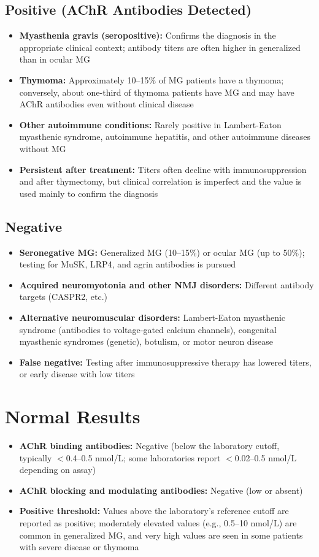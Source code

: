 \subsection*{Positive (AChR Antibodies Detected)}
\begin{itemize}
  \item \textbf{Myasthenia gravis (seropositive):} Confirms the diagnosis in the appropriate clinical context; antibody titers are often higher in generalized than in ocular MG
  \item \textbf{Thymoma:} Approximately 10--15\% of MG patients have a thymoma; conversely, about one-third of thymoma patients have MG and may have AChR antibodies even without clinical disease
  \item \textbf{Other autoimmune conditions:} Rarely positive in Lambert-Eaton myasthenic syndrome, autoimmune hepatitis, and other autoimmune diseases without MG
  \item \textbf{Persistent after treatment:} Titers often decline with immunosuppression and after thymectomy, but clinical correlation is imperfect and the value is used mainly to confirm the diagnosis
\end{itemize}

\subsection*{Negative}
\begin{itemize}
  \item \textbf{Seronegative MG:} Generalized MG (10--15\%) or ocular MG (up to 50\%); testing for MuSK, LRP4, and agrin antibodies is pursued
  \item \textbf{Acquired neuromyotonia and other NMJ disorders:} Different antibody targets (CASPR2, etc.)
  \item \textbf{Alternative neuromuscular disorders:} Lambert-Eaton myasthenic syndrome (antibodies to voltage-gated calcium channels), congenital myasthenic syndromes (genetic), botulism, or motor neuron disease
  \item \textbf{False negative:} Testing after immunosuppressive therapy has lowered titers, or early disease with low titers
\end{itemize}

\section*{Normal Results}
\begin{itemize}
  \item \textbf{AChR binding antibodies:} Negative (below the laboratory cutoff, typically $<$0.4--0.5 nmol/L; some laboratories report $<$0.02--0.5 nmol/L depending on assay)
  \item \textbf{AChR blocking and modulating antibodies:} Negative (low or absent)
  \item \textbf{Positive threshold:} Values above the laboratory's reference cutoff are reported as positive; moderately elevated values (e.g., 0.5--10 nmol/L) are common in generalized MG, and very high values are seen in some patients with severe disease or thymoma
\end{itemize}

